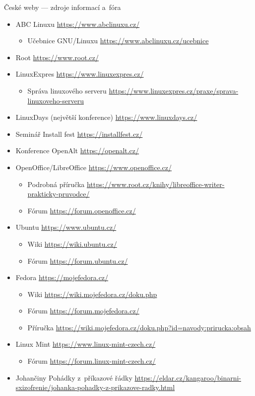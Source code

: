\documentclass[compress, xelatex, 11pt, xcolor=svgnames, aspectratio=169,
	hyperref={
		bookmarks=true,
		unicode=true,
		colorlinks=true,
		pdftitle={Linux, command line and MetaCentrum},
		plainpages=false,
		pdfauthor={Vojtech Zeisek},
		pdfsubject={Course about use of Linux command line, writing shell scripts and using MetaCentrum of CESNET},
		pdfcreator={XeLaTeX},
		pdfkeywords={Linux, GNU, BASH, shell, command line, MetaCentrum},
		linkcolor=DarkRed, %
		anchorcolor=DarkBlue, %
		citecolor=Indigo, %
		filecolor=NavyBlue, %
		menucolor=DarkMagenta, %
		urlcolor=DarkBlue, %
		},
	url={hyphens, lowtilde} %
	]{beamer}
\begin{document}
\begin{frame}[allowframebreaks]{České weby --- zdroje informací a~fóra}
	\begin{itemize}
		\item ABC Linuxu \url{https://www.abclinuxu.cz/}
		\begin{itemize}
			\item Učebnice GNU/Linuxu \url{https://www.abclinuxu.cz/ucebnice}
		\end{itemize}
		\item Root \url{https://www.root.cz/}
		\item LinuxExpres \url{https://www.linuxexpres.cz/}
		\begin{itemize}
			\item Správa linuxového serveru \url{https://www.linuxexpres.cz/praxe/sprava-linuxoveho-serveru}
		\end{itemize}
		\item LinuxDays (největší konference) \url{https://www.linuxdays.cz/}
		\item Seminář Install fest \url{https://installfest.cz/}
		\item Konference OpenAlt \url{https://openalt.cz/}
		\item OpenOffice/LibreOffice \url{https://www.openoffice.cz/}
		\begin{itemize}
			\item Podrobná příručka \url{https://www.root.cz/knihy/libreoffice-writer-prakticky-pruvodce/}
			\item Fórum \url{https://forum.openoffice.cz/}
		\end{itemize}
		\item Ubuntu \url{https://www.ubuntu.cz/}
		\begin{itemize}
			\item Wiki \url{https://wiki.ubuntu.cz/}
			\item Fórum \url{https://forum.ubuntu.cz/}
		\end{itemize}
		\item Fedora \url{https://mojefedora.cz/}
		\begin{itemize}
			\item Wiki \url{https://wiki.mojefedora.cz/doku.php}
			\item Fórum \url{https://forum.mojefedora.cz/}
			\item Příručka \url{https://wiki.mojefedora.cz/doku.php?id=navody:prirucka:obsah}
		\end{itemize}
		\item Linux Mint \url{https://www.linux-mint-czech.cz/}
		\begin{itemize}
			\item Fórum \url{https://forum.linux-mint-czech.cz/}
		\end{itemize}
		\item Johančiny Pohádky z~příkazové řádky \url{https://eldar.cz/kangaroo/binarni-sxizofrenie/johanka-pohadky-z-prikazove-radky.html}
	\end{itemize}
\end{frame}
\end{document}
